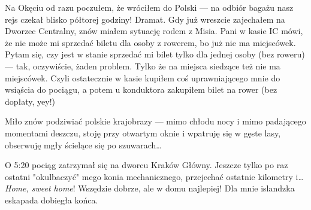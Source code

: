 Na Okęciu od razu poczułem, że wróciłem do Polski --- na odbiór bagażu nasz rejs czekał blisko półtorej godziny! Dramat. Gdy już wreszcie zajechałem na Dworzec Centralny, znów miałem sytuację rodem z Misia. Pani w kasie IC mówi, że nie może mi sprzedać biletu dla osoby z rowerem, bo już nie ma miejscówek. Pytam się, czy jest w stanie sprzedać mi bilet tylko dla jednej osoby (bez roweru) --- tak, oczywiście, żaden problem. Tylko że na miejsca siedzące też nie ma miejscówek. Czyli ostatecznie w kasie kupiłem coś uprawniającego mnie do wsiąścia do pociągu, a potem u konduktora zakupiłem bilet na rower (bez dopłaty, yey!)

Miło znów podziwiać polskie krajobrazy --- mimo chłodu nocy i mimo padającego momentami deszczu, stoję przy otwartym oknie i wpatruję się w gęste lasy, obserwuję mgły ścielące się po szuwarach…

O 5:20 pociąg zatrzymał się na dworcu Kraków Główny. Jeszcze tylko po raz ostatni "okulbaczyć" mego konia mechanicznego, przejechać ostatnie kilometry i… \emph{Home, sweet home}! Wszędzie dobrze, ale w domu najlepiej! Dla mnie islandzka eskapada dobiegła końca.

